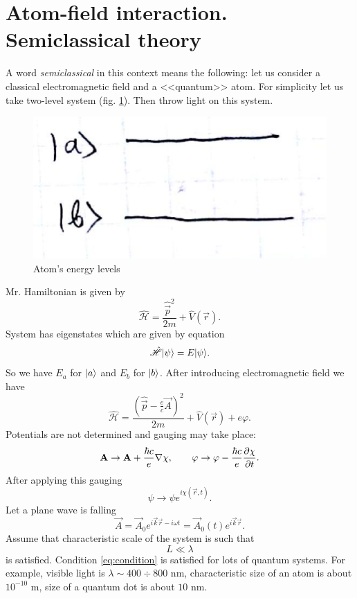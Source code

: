\section{Atom-field interaction. Semiclassical theory}
\label{sec:atom-field_interaction}

A word \textit{semiclassical} in this context means the following: let us consider a classical electromagnetic field and a <<quantum>> atom. For simplicity let us take two-level system (fig. \ref{fig:2lvl}). Then throw light on this system.
\begin{figure}[h!]
	\centering
	\includegraphics[width=0.35\linewidth]{fig/L4/2lvl}
	\caption{Atom's energy levels }
	\label{fig:2lvl}
\end{figure}

Mr. Hamiltonian is given by
\begin{equation}
	\hat{\mathscr{H}} = \frac{\hat{\vec{p}}^2}{2 m} + \hat{V} (\vec{r}).
\end{equation}
System has eigenstates which are given by equation
\begin{equation}
	\hat{\mathscr{H}} \lvert\psi\rangle = E \lvert\psi\rangle.
\end{equation}
So we have $E_a$ for $\lvert a\rangle$ and $E_b$ for $\lvert b\rangle$. After introducing electromagnetic field we have
\begin{equation}
	\hat{\mathscr{H}} = \frac{(\hat{\vec{p}} - \frac{e}{c} \vec{A})^2}{2m} + \hat{V}(\vec{r}) + e \varphi.
\end{equation}
Potentials are not determined and gauging may take place:
\begin{equation}
	\mathbf{A} \to \mathbf{A} + \frac{\hbar c}{e} \nabla \chi, \qquad \varphi \to \varphi - \frac{\hbar c}{e} \dfrac{\partial {\chi}}{\partial {t}}.
\end{equation}
After applying this gauging 
\begin{equation}
	\psi \to \psi e^{i \chi(\vec{r},t)}.
\end{equation}
Let a plane wave is falling 
\begin{equation}
	\vec{A} = \vec{A}_0 e^{i \vec{k}\vec{r} - i \omega t} = \vec{A}_0(t) e^{i \vec{k}\vec{r}}.
\end{equation}
Assume that characteristic scale of the system is such that 
\begin{equation}
	L \ll \lambda
	\label{eq:condition}
\end{equation}
is satisfied. Condition \eqref{eq:condition} is satisfied for lots of quantum systems. 
For example, visible light is $\lambda \sim 400 \div 800 \text{ nm}$, 
characteristic size of an atom is about $10^{-10} \text{ m}$, size of a quantum dot is about $10 \text{ nm}$. 

